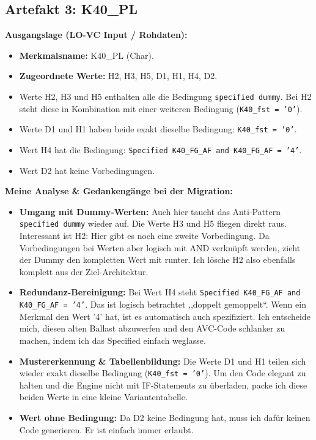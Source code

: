 \documentclass[12pt, a4paper, oneside]{book}
\begin{document}
\vspace{1em}

\subsection*{Artefakt 3: K40\_PL}

\textbf{Ausgangslage (LO-VC Input / Rohdaten):}
\begin{itemize}
    \item \textbf{Merkmalsname:} K40\_PL (Char).
    \item \textbf{Zugeordnete Werte:} H2, H3, H5, D1, H1, H4, D2.
    \item Werte H2, H3 und H5 enthalten alle die Bedingung \texttt{specified dummy}. Bei H2 steht diese in Kombination mit einer weiteren Bedingung (\texttt{K40\_fst = '0'}).
    \item Werte D1 und H1 haben beide exakt dieselbe Bedingung: \texttt{K40\_fst = '0'}.
    \item Wert H4 hat die Bedingung: \texttt{Specified K40\_FG\_AF and K40\_FG\_AF = '4'}.
    \item Wert D2 hat keine Vorbedingungen.
\end{itemize}

\textbf{Meine Analyse \& Gedankengänge bei der Migration:}
\begin{itemize}
    \item \textbf{Umgang mit Dummy-Werten:} Auch hier taucht das Anti-Pattern \texttt{specified dummy} wieder auf. Die Werte H3 und H5 fliegen direkt raus. Interessant ist H2: Hier gibt es noch eine zweite Vorbedingung. Da Vorbedingungen bei Werten aber logisch mit AND verknüpft werden, zieht der Dummy den kompletten Wert mit runter. Ich lösche H2 also ebenfalls komplett aus der Ziel-Architektur.
    \item \textbf{Redundanz-Bereinigung:} Bei Wert H4 steht \texttt{Specified K40\_FG\_AF and K40\_FG\_AF = '4'}. Das ist logisch betrachtet ,,doppelt gemoppelt``. Wenn ein Merkmal den Wert '4' hat, ist es automatisch auch spezifiziert. Ich entscheide mich, diesen alten Ballast abzuwerfen und den AVC-Code schlanker zu machen, indem ich das Specified einfach weglasse.
    \item \textbf{Mustererkennung \& Tabellenbildung:} Die Werte D1 und H1 teilen sich wieder exakt dieselbe Bedingung (\texttt{K40\_fst = '0'}). Um den Code elegant zu halten und die Engine nicht mit IF-Statements zu überladen, packe ich diese beiden Werte in eine kleine Variantentabelle.
    \item \textbf{Wert ohne Bedingung:} Da D2 keine Bedingung hat, muss ich dafür keinen Code generieren. Er ist einfach immer erlaubt.
\end{itemize}
\end{document}
